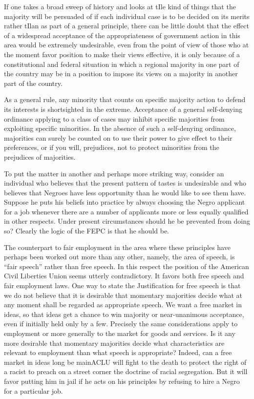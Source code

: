 \documentclass[11pt,openany]{book}
\begin{document}
If one takes a broad sweep of history and looks at tIle kind of things that the majority will be persuaded of if each individual case is to be decided on its merits rather tIlan as part of a general principle, there can be little doubt that the effect of a widespread acceptance of the appropriateness of government action in this area would be extremely undesirable, even from the point of view of those who at the moment favor position to make their views effective, it is only because of a constitutional and federal situation in which a regional majority in one part of the country may be in a position to impose its views on a majority in another part of the country.

As a general rule, any minority that counts on specific majority action to defend its interests is shortsighted in the extreme. Acceptance of a general self-denying ordinance applying to a class of cases may inhibit specific majorities from exploiting specific minorities. In the absence of such a self-denying ordinance, majorities can surely be counted on to use their power to give effect to their preferences, or if you will, prejudices, not to protect minorities from the prejudices of majorities.

To put the matter in another and perhaps more striking way, consider an individual who believes that the present pattern of tastes is undesirable and who believes that Negroes have less opportunity than he would like to see them have. Suppose he puts his beliefs into practice by always choosing the Negro applicant for a job whenever there are a number of applicants more or less equally qualified in other respects. Under present circumstances should he be prevented from doing so? Clearly the logic of the FEPC is that he should be.

The counterpart to fair employment in the area where these principles have perhaps been worked out more than any other, namely, the area of speech, is ``fair speech'' rather than free speech. In this respect the position of the American Civil Liberties Union seems utterly contradictory. It favors both free speech and fair employment laws. One way to state the Justification for free speech is that we do not believe that it is desirable that momentary majorities decide what at any moment shall be regarded as appropriate speech. We want a free market in ideas, so that ideas get a chance to win majority or near-unanimous acceptance, even if initially held only by a few. Precisely the same considerations apply to employment or more generally to the market for goods and services. Is it any more desirable that momentary majorities decide what characteristics are relevant to employment than what speech is appropriate? Indeed, can a free market in ideas long be mainACLU will fight to the death to protect the right of a racist to preach on a street corner the doctrine of racial segregation. But it will favor putting him in jail if he acts on his principles by refusing to hire a Negro for a particular job.
\end{document}
